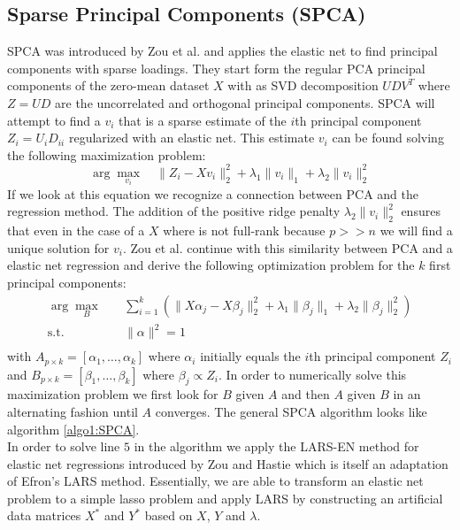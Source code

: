 \documentclass[11pt,letterpaper]{report}
\begin{document}
\subsection*{Sparse Principal Components (SPCA)}
SPCA was introduced by Zou et al. \cite{Zou2006} and applies the elastic net to find principal components with sparse loadings. They start form the regular PCA principal components of the zero-mean dataset $X$ with as SVD decomposition $UDV^T$ where $Z=UD$ are the uncorrelated and orthogonal principal components. SPCA will attempt to find a $v_i$ that is a sparse estimate of the $i$th principal component $Z_i = U_iD_{ii}$ regularized with an elastic net. This estimate $v_i$ can be found solving the following maximization problem:
\begin{equation*}
\arg\max_{v_{i}} \quad \|Z_i - X v_i\|_2^2 + \lambda_1\|v_i\|_1 + \lambda_2\|v_i\|_2^2
\end{equation*}
If we look at this equation we recognize a connection between PCA and the regression method. The addition of the positive ridge penalty $\lambda_2\|v_i\|_2^2$ ensures that even in the case of a $X$ where is not full-rank because $p>>n$ we will find a unique solution for $v_i$. Zou et al. continue with this similarity between PCA and a elastic net regression and derive the following optimization problem for the $k$ first principal components:
\begin{equation*}
\begin{aligned}
\arg\max_{B} \quad & \sum_{i=1}^{k} \left(\|X\alpha_j-X\beta_j\|_2^2 +\lambda_1 \|\beta_j\|_1 + \lambda_2\|\beta_j\|_2^2\right)\\
\textrm{s.t.} \quad & \|\alpha\|^2 = 1\\
\end{aligned}
\end{equation*}
with $A_{p\times k} = [\alpha_1,\ldots,\alpha_k]$ where $\alpha_i$ initially equals the $i$th principal component $Z_i$ and $B_{p\times k} = [\beta_1,\ldots,\beta_k]$ where $\beta_j\propto Z_i$. In order to numerically solve this maximization problem we first look for $B$ given $A$ and then $A$ given $B$ in an alternating fashion until $A$ converges. The general SPCA algorithm looks like algorithm \ref{algo1:SPCA}.\\

In order to solve line $5$ in the algorithm we apply the LARS-EN method for elastic net regressions introduced by Zou and Hastie \cite{Zou2005} which is itself an adaptation of Efron's \citeyear{Efron2004} LARS method. Essentially, we are able to transform an elastic net problem to a simple lasso problem and apply LARS by constructing an artificial data matrices $X^*$ and $Y^*$ based on $X$, $Y$ and $\lambda$.
\end{document}
